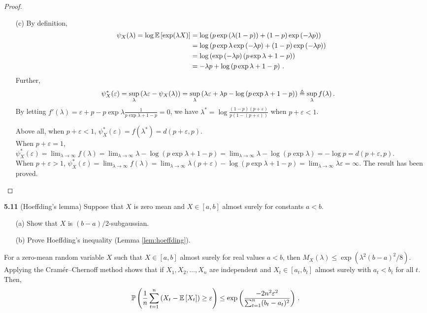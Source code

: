 \begin{proof}
\begin{enumerate}
	\item[(c)] By definition, 
	\begin{align*}
		\psi_X(\lambda) = \log \mathbb{E} \left[\exp(\lambda X)\right] &= \log\left( p\exp\left(\lambda(1-p)\right) + (1-p)\exp\left(-\lambda p\right) \right) \\
		&= \log\left( p\exp\lambda \exp\left(-\lambda p\right) + (1-p)\exp\left(-\lambda p\right) \right)\\
		&= \log\left(  \exp\left(-\lambda p\right)\left( p\exp\lambda+1-p \right) \right)\\
		&= -\lambda p + \log \left( p\exp\lambda+1-p \right)\,.
	\end{align*}
	Further, 
	\begin{align*}
		\psi_X^*(\varepsilon) &= \sup_{\lambda} \left( \lambda\varepsilon - \psi_X(\lambda) \right) 
		= \sup_{\lambda} \left( \lambda\varepsilon +\lambda p - \log \left( p\exp\lambda+1-p \right)\right) \triangleq \sup_{\lambda} f(\lambda) \,.
	\end{align*}
	By letting $f'(\lambda) = \varepsilon+p-p\exp \lambda \frac{1}{p\exp \lambda +1-p} = 0$, we have $\lambda^* = \log \frac{(1-p)(p+\varepsilon)}{p(1-(p+\varepsilon))}$ when $p+\varepsilon<1$. 

	Above all, when $p+\varepsilon<1$, $\psi_X^*(\varepsilon) = f(\lambda^*) = d(p+\varepsilon,p)$. \\
	When $p+\varepsilon=1$, $\psi_X^*(\varepsilon) = \lim_{\lambda \to \infty} f(\lambda) = \lim_{\lambda\to \infty}\lambda-\log (p\exp \lambda+1-p) = \lim_{\lambda\to \infty} \lambda-\log (p\exp \lambda) = -\log p = d(p+\varepsilon,p)$.\\
	When $p+\varepsilon>1$, $\psi_X^*(\varepsilon) = \lim_{\lambda \to \infty} f(\lambda) = \lim_{\lambda\to \infty}\lambda(p+\varepsilon)-\log (p\exp \lambda+1-p) = \lim_{\lambda\to \infty} \lambda\varepsilon=\infty $. The result has been proved.

\end{enumerate}
\end{proof}


\noindent\textbf{5.11} (Hoeffding's lemma) Suppose that $X$ is zero mean and $X \in [a,b]$ almost surely for constants $a <b$.
\begin{enumerate}
	\item[(a)]Show that $X$ is $(b-a)/2$-subgaussian.
	\item[(b)]Prove Hoeffding's inequality (Lemma \ref{lem:hoeffding}).
\end{enumerate}
\begin{lemma}\label{lem:hoeffding}
	For a zero-mean random variable $X$ such that $X \in [a,b]$ almost surely for real values $a <b$, then $M_X(\lambda) \le \exp(\lambda^2 (b-a)^2 / 8)$. Applying the Cramér–Chernoff method shows that if $X_1,X_2,\ldots,X_n$ are independent and $X_t \in [a_t,b_t]$ almost surely with $a_t < b_t$ for all $t$. Then, 
	\begin{align}
		\mathbb{P} \left(\frac{1}{n} \sum_{t=1}^n \left(X_t - \mathbb{E} \left[X_t\right]\right) \ge \varepsilon \right) \le \exp\left( \frac{-2n^2\varepsilon^2}{\sum_{t=1}^n (b_t-a_t)^2 } \right)\,.
	\end{align}
\end{lemma}

